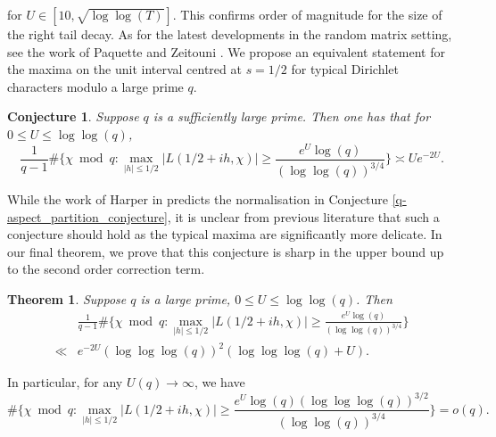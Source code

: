 \documentclass[reqno]{amsart}
\newtheorem{conjecture}{Conjecture}
\newtheorem{theorem}{Theorem}
\theoremstyle{definition}
\theoremstyle{remark}
\numberwithin{equation}{section}
\theoremstyle{remark}
\begin{document}
for $U \in [10,\sqrt{\log\log(T)}]$. This confirms order of magnitude for the size of the right tail decay. As for the latest developments in the random matrix setting, see the work of Paquette and Zeitouni \cite{pz22}. We propose an equivalent statement for the maxima on the unit interval centred at $s=1/2$ for typical Dirichlet characters modulo a large prime $q$.
\begin{conjecture} \label{constant_qFHK}
    Suppose $q$ is a sufficiently large prime. Then one has that for $0 \leq U \leq \log\log(q)$,
    \begin{equation} \label{q_count}
        \frac{1}{q-1}\#\big\{\chi \bmod{q}: \max_{|h| \leq 1/2}|L(1/2+ih,\chi)| \geq \frac{e^U\log(q)}{(\log\log(q))^{3/4}} \big\} \asymp Ue^{-2U}.
    \end{equation}
\end{conjecture}
While the work of Harper in \cite{harper2023typicalsizecharacterzeta} predicts the normalisation in Conjecture \ref{q-aspect_partition_conjecture}, it is unclear from previous literature that such a conjecture should hold as the typical maxima are significantly more delicate. In our final theorem, we prove that this conjecture is sharp in the upper bound up to the second order correction term.
\begin{theorem}
    Suppose $q$ is a large prime, $0 \leq U \leq \log\log(q)$. Then 
    \begin{align*}
        &\frac{1}{q-1}\#\big\{\chi \bmod{q}: \max_{|h| \leq 1/2}|L(1/2+ih,\chi)| \geq \frac{e^U\log(q)}{(\log\log(q))^{3/4}} \big\} \\ \ll& e^{-2U}(\log\log\log(q))^2(\log\log\log(q) + U).
    \end{align*}
    \label{short_range_max}
\end{theorem}
In particular, for any $U(q) \to \infty$, we have
$$\#\big\{\chi \bmod{q}: \max_{|h| \leq 1/2}|L(1/2+ih,\chi)| \geq \frac{e^U\log(q)(\log\log\log(q))^{3/2}}{(\log\log(q))^{3/4}}\big\} =o(q).$$
\end{document}
